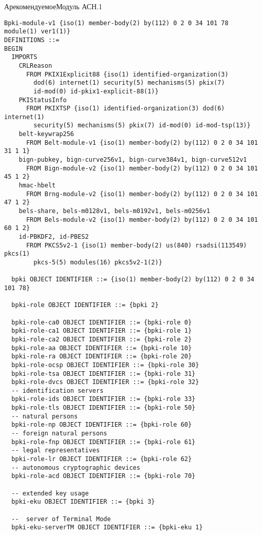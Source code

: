\begin{appendix}{А}{рекомендуемое}{Модуль АСН.1}\label{ASN1}

\mbox{}

\begin{verbatim}
Bpki-module-v1 {iso(1) member-body(2) by(112) 0 2 0 34 101 78 module(1) ver1(1)}
DEFINITIONS ::=
BEGIN
  IMPORTS
    CRLReason
      FROM PKIX1Explicit88 {iso(1) identified-organization(3)
        dod(6) internet(1) security(5) mechanisms(5) pkix(7)
        id-mod(0) id-pkix1-explicit-88(1)}
    PKIStatusInfo
      FROM PKIXTSP {iso(1) identified-organization(3) dod(6) internet(1)
        security(5) mechanisms(5) pkix(7) id-mod(0) id-mod-tsp(13)}
    belt-keywrap256
      FROM Belt-module-v1 {iso(1) member-body(2) by(112) 0 2 0 34 101 31 1 1}
    bign-pubkey, bign-curve256v1, bign-curve384v1, bign-curve512v1
      FROM Bign-module-v2 {iso(1) member-body(2) by(112) 0 2 0 34 101 45 1 2}
    hmac-hbelt
      FROM Brng-module-v2 {iso(1) member-body(2) by(112) 0 2 0 34 101 47 1 2}
    bels-share, bels-m0128v1, bels-m0192v1, bels-m0256v1
      FROM Bels-module-v2 {iso(1) member-body(2) by(112) 0 2 0 34 101 60 1 2}
    id-PBKDF2, id-PBES2
      FROM PKCS5v2-1 {iso(1) member-body(2) us(840) rsadsi(113549) pkcs(1) 
        pkcs-5(5) modules(16) pkcs5v2-1(2)}

  bpki OBJECT IDENTIFIER ::= {iso(1) member-body(2) by(112) 0 2 0 34 101 78}

  bpki-role OBJECT IDENTIFIER ::= {bpki 2}

  bpki-role-ca0 OBJECT IDENTIFIER ::= {bpki-role 0}
  bpki-role-ca1 OBJECT IDENTIFIER ::= {bpki-role 1}
  bpki-role-ca2 OBJECT IDENTIFIER ::= {bpki-role 2}
  bpki-role-aa OBJECT IDENTIFIER ::= {bpki-role 10}
  bpki-role-ra OBJECT IDENTIFIER ::= {bpki-role 20}
  bpki-role-ocsp OBJECT IDENTIFIER ::= {bpki-role 30}
  bpki-role-tsa OBJECT IDENTIFIER ::= {bpki-role 31}
  bpki-role-dvcs OBJECT IDENTIFIER ::= {bpki-role 32}
  -- identification servers
  bpki-role-ids OBJECT IDENTIFIER ::= {bpki-role 33}
  bpki-role-tls OBJECT IDENTIFIER ::= {bpki-role 50}
  -- natural persons
  bpki-role-np OBJECT IDENTIFIER ::= {bpki-role 60}
  -- foreign natural persons
  bpki-role-fnp OBJECT IDENTIFIER ::= {bpki-role 61}
  -- legal representatives
  bpki-role-lr OBJECT IDENTIFIER ::= {bpki-role 62}
  -- autonomous cryptographic devices
  bpki-role-acd OBJECT IDENTIFIER ::= {bpki-role 70}

  -- extended key usage
  bpki-eku OBJECT IDENTIFIER ::= {bpki 3}

  --  server of Terminal Mode
  bpki-eku-serverTM OBJECT IDENTIFIER ::= {bpki-eku 1}


\end{verbatim}
\end{appendix}
